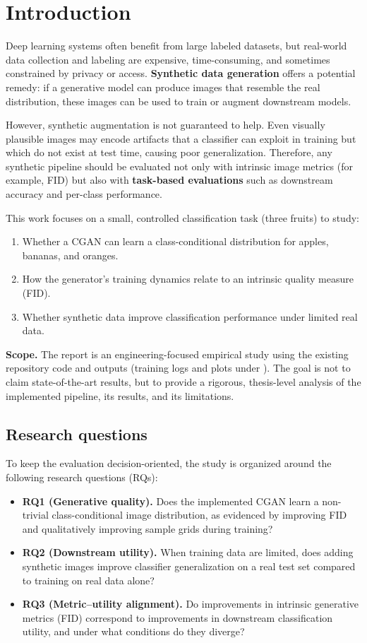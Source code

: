 \section{Introduction}

Deep learning systems often benefit from large labeled datasets, but real-world data collection and labeling are expensive, time-consuming, and sometimes constrained by privacy or access. \textbf{Synthetic data generation} offers a potential remedy: if a generative model can produce images that resemble the real distribution, these images can be used to train or augment downstream models.

However, synthetic augmentation is not guaranteed to help. Even visually plausible images may encode artifacts that a classifier can exploit in training but which do not exist at test time, causing poor generalization. Therefore, any synthetic pipeline should be evaluated not only with intrinsic image metrics (for example, FID) but also with \textbf{task-based evaluations} such as downstream accuracy and per-class performance.

This work focuses on a small, controlled classification task (three fruits) to study:
\begin{enumerate}
\item Whether a CGAN can learn a class-conditional distribution for apples, bananas, and oranges.
\item How the generator's training dynamics relate to an intrinsic quality measure (FID).
\item Whether synthetic data improve classification performance under limited real data.
\end{enumerate}

\textbf{Scope.} The report is an engineering-focused empirical study using the existing repository code and outputs (training logs and plots under ). The goal is not to claim state-of-the-art results, but to provide a rigorous, thesis-level analysis of the implemented pipeline, its results, and its limitations.

\subsection{Research questions}

To keep the evaluation decision-oriented, the study is organized around the following research questions (RQs):
\begin{itemize}
\item \textbf{RQ1 (Generative quality).} Does the implemented CGAN learn a non-trivial class-conditional image distribution, as evidenced by improving FID and qualitatively improving sample grids during training?
\item \textbf{RQ2 (Downstream utility).} When training data are limited, does adding synthetic images improve classifier generalization on a real test set compared to training on real data alone?
\item \textbf{RQ3 (Metric--utility alignment).} Do improvements in intrinsic generative metrics (FID) correspond to improvements in downstream classification utility, and under what conditions do they diverge?
\end{itemize}

